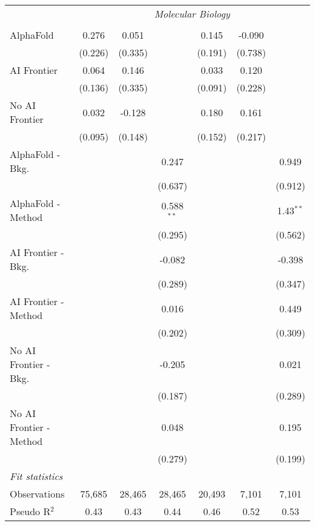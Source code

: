 \begin{tabular}{lcccccc}
 & \multicolumn{6}{c}{\textit{Molecular Biology}} \\ \\
   AlphaFold               & 0.276   & 0.051   &              & 0.145   & -0.090  &   \\   
                           & (0.226) & (0.335) &              & (0.191) & (0.738) &   \\   
   AI Frontier             & 0.064   & 0.146   &              & 0.033   & 0.120   &   \\   
                           & (0.136) & (0.335) &              & (0.091) & (0.228) &   \\   
   No AI Frontier          & 0.032   & -0.128  &              & 0.180   & 0.161   &   \\   
                           & (0.095) & (0.148) &              & (0.152) & (0.217) &   \\   
   AlphaFold - Bkg.        &         &         & 0.247        &         &         & 0.949\\   
                           &         &         & (0.637)      &         &         & (0.912)\\   
   AlphaFold - Method      &         &         & 0.588$^{**}$ &         &         & 1.43$^{**}$\\   
                           &         &         & (0.295)      &         &         & (0.562)\\   
   AI Frontier - Bkg.      &         &         & -0.082       &         &         & -0.398\\   
                           &         &         & (0.289)      &         &         & (0.347)\\   
   AI Frontier - Method    &         &         & 0.016        &         &         & 0.449\\   
                           &         &         & (0.202)      &         &         & (0.309)\\   
   No AI Frontier - Bkg.   &         &         & -0.205       &         &         & 0.021\\   
                           &         &         & (0.187)      &         &         & (0.289)\\   
   No AI Frontier - Method &         &         & 0.048        &         &         & 0.195\\   
                           &         &         & (0.279)      &         &         & (0.199)\\   
   \midrule
   \emph{Fit statistics}\\
   Observations            & 75,685  & 28,465  & 28,465       & 20,493  & 7,101   & 7,101\\  
   Pseudo R$^2$            & 0.43    & 0.43    & 0.44         & 0.46    & 0.52    & 0.53\\  
   

\end{tabular}
